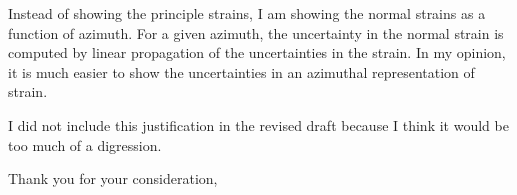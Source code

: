 \documentclass[10pt,a4paper]{letter}
\begin{document}
\begin{letter}{}
Instead of showing the principle strains, I am showing the normal
strains as a function of azimuth. For a given azimuth, the uncertainty
in the normal strain is computed by linear propagation of the
uncertainties in the strain. In my opinion, it is much easier to show
the uncertainties in an azimuthal representation of strain.

I did not include this justification in the revised draft because I
think it would be too much of a digression.

\closing{Thank you for your consideration,}

\end{letter}
\end{document}
